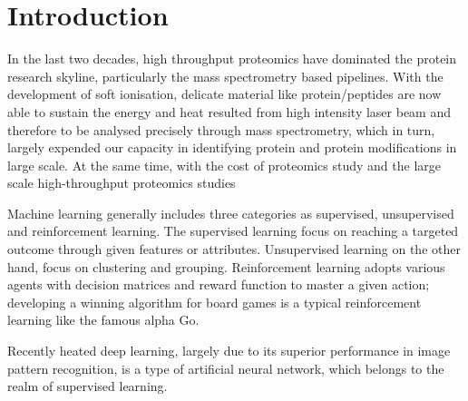 \section{Introduction}

In the last two decades, high throughput proteomics have dominated the protein research skyline, particularly the mass spectrometry based pipelines. With the development of soft ionisation, delicate material like protein/peptides are now able to sustain the energy and heat resulted from high intensity laser beam and therefore to be analysed precisely through mass spectrometry, which in turn, largely expended our capacity in identifying protein and protein modifications in large scale. At the same time, with the cost of proteomics study and the large scale high-throughput proteomics studies 
\par 
Machine learning generally includes three categories as supervised, unsupervised and reinforcement learning. The supervised learning focus on reaching a targeted outcome through given features or attributes. Unsupervised learning on the other hand, focus on clustering and grouping. Reinforcement learning adopts various agents with decision matrices and reward function to master a given action; developing a winning algorithm for board games is a typical reinforcement learning like the famous alpha Go.
\par
Recently heated deep learning, largely due to its superior performance in image pattern recognition, is a type of artificial neural network, which belongs to the realm of supervised learning. 

